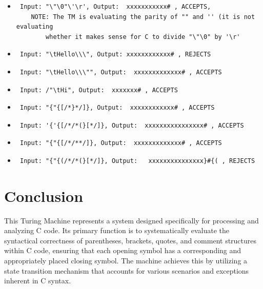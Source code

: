 \documentclass{article}
\begin{document}
\begin{itemize}
    \item \begin{verbatim} Input: "\"\0"\'\r', Output:  xxxxxxxxxxx# , ACCEPTS, 
    NOTE: The TM is evaluating the parity of "" and '' (it is not evaluating 
        whether it makes sense for C to divide "\"\0" by '\r' \end{verbatim} 
    \item \begin{verbatim} Input: "\tHello\\\", Output: xxxxxxxxxxxx# , REJECTS \end{verbatim}
    \item \begin{verbatim} Input: "\tHello\\\"", Output:  xxxxxxxxxxxxx# , ACCEPTS \end{verbatim}
    \item \begin{verbatim} Input: /"\tHi", Output:  xxxxxxx# , ACCEPTS \end{verbatim}
    \item \begin{verbatim} Input: "{"{[/*}*/]}, Output:  xxxxxxxxxxxx# , ACCEPTS \end{verbatim}
    \item \begin{verbatim} Input: '{'{[/*/*(}[*/]}, Output:  xxxxxxxxxxxxxxxx# , ACCEPTS \end{verbatim} 
    \item \begin{verbatim} Input: "{"{[/*/**/]}, Output:  xxxxxxxxxxxxx# , ACCEPTS \end{verbatim}
    \item \begin{verbatim} Input: "{"{(/*/*(}[*/]}, Output:   xxxxxxxxxxxxxxx}#{( , REJECTS \end{verbatim}

\end{itemize}

\section{Conclusion}
This Turing Machine represents a system designed specifically for processing and analyzing C code. Its primary function is to systematically evaluate 
the syntactical correctness of parentheses, brackets, quotes, and comment structures within C code, ensuring that each opening symbol has a corresponding and 
appropriately placed closing symbol. The machine achieves this by utilizing a state transition mechanism that accounts for various scenarios and 
exceptions inherent in C syntax.
\end{document}
